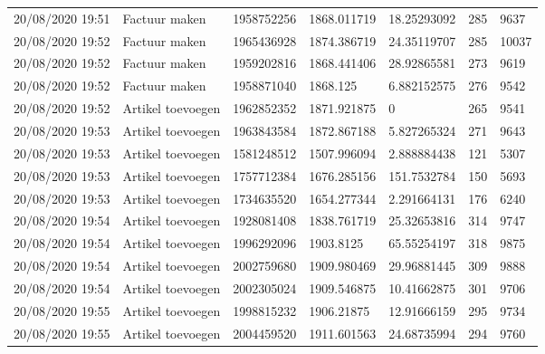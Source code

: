 \begin{tiny}
\begin{longtable}{lllllll}
    20/08/2020 19:51 & Factuur maken         & 1958752256        & 1868.011719 & 18.25293092           & 285              & 9637             \\
    20/08/2020 19:52 & Factuur maken         & 1965436928        & 1874.386719 & 24.35119707           & 285              & 10037            \\
    20/08/2020 19:52 & Factuur maken         & 1959202816        & 1868.441406 & 28.92865581           & 273              & 9619             \\
    20/08/2020 19:52 & Factuur maken         & 1958871040        & 1868.125    & 6.882152575           & 276              & 9542             \\
    20/08/2020 19:52 & Artikel toevoegen     & 1962852352        & 1871.921875 & 0                     & 265              & 9541             \\
    20/08/2020 19:53 & Artikel toevoegen     & 1963843584        & 1872.867188 & 5.827265324           & 271              & 9643             \\
    20/08/2020 19:53 & Artikel toevoegen     & 1581248512        & 1507.996094 & 2.888884438           & 121              & 5307             \\
    20/08/2020 19:53 & Artikel toevoegen     & 1757712384        & 1676.285156 & 151.7532784           & 150              & 5693             \\
    20/08/2020 19:53 & Artikel toevoegen     & 1734635520        & 1654.277344 & 2.291664131           & 176              & 6240             \\
    20/08/2020 19:54 & Artikel toevoegen     & 1928081408        & 1838.761719 & 25.32653816           & 314              & 9747             \\
    20/08/2020 19:54 & Artikel toevoegen     & 1996292096        & 1903.8125   & 65.55254197           & 318              & 9875             \\
    20/08/2020 19:54 & Artikel toevoegen     & 2002759680        & 1909.980469 & 29.96881445           & 309              & 9888             \\
    20/08/2020 19:54 & Artikel toevoegen     & 2002305024        & 1909.546875 & 10.41662875           & 301              & 9706             \\
    20/08/2020 19:55 & Artikel toevoegen     & 1998815232        & 1906.21875  & 12.91666159           & 295              & 9734             \\
    20/08/2020 19:55 & Artikel toevoegen     & 2004459520        & 1911.601563 & 24.68735994           & 294              & 9760             \\

\end{longtable}
\end{tiny}
